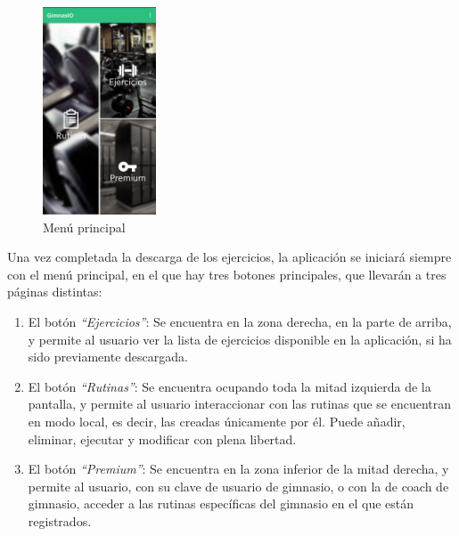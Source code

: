\documentclass[11pt,a4paper]{report}
\begin{document}
\begin{figure}[H]
	\centering
	\includegraphics[width=0.3\textwidth]{graficos/manual/Menu.jpg}
	\caption{Menú principal}
\end{figure}
Una vez completada la descarga de los ejercicios, la aplicación se iniciará siempre con el menú principal, en el que hay tres botones principales, que llevarán a tres páginas distintas:
\begin{enumerate}
	\item El botón \textit{“Ejercicios”}: Se encuentra en la zona derecha, en la parte de arriba, y permite al usuario ver la lista de ejercicios disponible en la aplicación, si ha sido previamente descargada.

	\item El botón \textit{“Rutinas”}: Se encuentra ocupando toda la mitad izquierda de la pantalla, y permite al usuario interaccionar con las rutinas que se encuentran en modo local, es decir, las creadas únicamente por él. Puede añadir, eliminar, ejecutar y modificar con plena libertad.

	\item El botón \textit{“Premium”}: Se encuentra en la zona inferior de la mitad derecha, y permite al usuario, con su clave de usuario de gimnasio, o con la de coach de gimnasio, acceder a las rutinas específicas del gimnasio en el que están registrados.

\end{enumerate}
\end{document}
